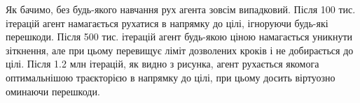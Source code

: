\documentclass[a4paper,10pt,fleqn]{article}
\begin{document}
Як бачимо, без будь-якого навчання рух агента зовсім випадковий. Після 100 тис. ітерацій агент намагається рухатися в напрямку до цілі, ігноруючи будь-які перешкоди. Після 500 тис. ітерацій агент будь-якою ціною намагається уникнути зіткнення, але при цьому перевищує ліміт дозволених кроків і не добирається до цілі. Після 1.2 млн ітерацій, як видно з рисунка, агент рухається якомога оптимальнішою траєкторією в напрямку до цілі, при цьому досить віртуозно оминаючи перешкоди.
\begin{figure}
  \centering
  \,
   \\
  \,

\end{figure}
\end{document}
